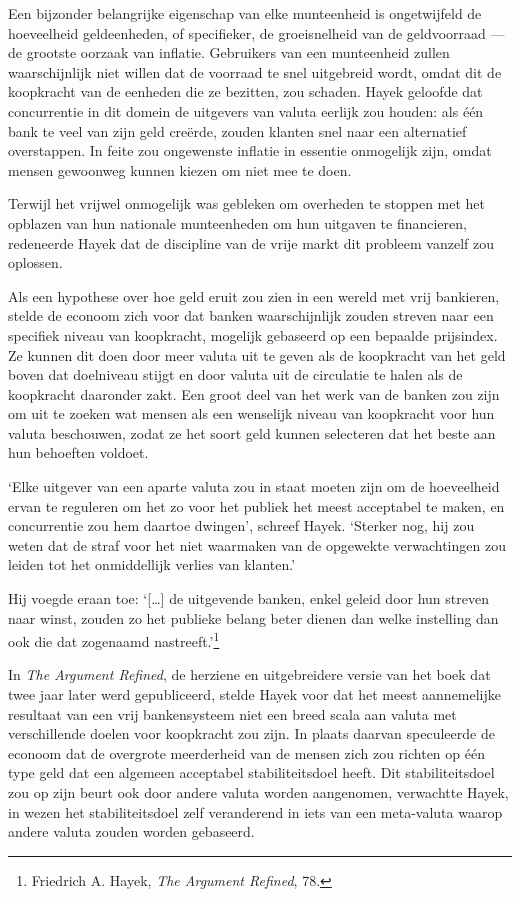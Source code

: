 \documentclass[
  a5paper,
  smalldemyvopaper,11pt,twoside,onecolumn,openright,extrafontsizes,
hidelinks]{memoir}
\begin{document}
Een bijzonder belangrijke eigenschap van elke munteenheid is
ongetwijfeld de hoeveelheid geldeenheden, of specifieker, de
groeisnelheid van de geldvoorraad --- de grootste oorzaak van inflatie.
Gebruikers van een munteenheid zullen waarschijnlijk niet willen dat de
voorraad te snel uitgebreid wordt, omdat dit de koopkracht van de
eenheden die ze bezitten, zou schaden. Hayek geloofde dat concurrentie
in dit domein de uitgevers van valuta eerlijk zou houden: als één bank
te veel van zijn geld creërde, zouden klanten snel naar een alternatief
overstappen. In feite zou ongewenste inflatie in essentie onmogelijk
zijn, omdat mensen gewoonweg kunnen kiezen om niet mee te doen.

Terwijl het vrijwel onmogelijk was gebleken om overheden te stoppen met
het opblazen van hun nationale munteenheden om hun uitgaven te
financieren, redeneerde Hayek dat de discipline van de vrije markt dit
probleem vanzelf zou oplossen.

Als een hypothese over hoe geld eruit zou zien in een wereld met vrij
bankieren, stelde de econoom zich voor dat banken waarschijnlijk zouden
streven naar een specifiek niveau van koopkracht, mogelijk gebaseerd op
een bepaalde prijsindex. Ze kunnen dit doen door meer valuta uit te
geven als de koopkracht van het geld boven dat doelniveau stijgt en door
valuta uit de circulatie te halen als de koopkracht daaronder zakt. Een
groot deel van het werk van de banken zou zijn om uit te zoeken wat
mensen als een wenselijk niveau van koopkracht voor hun valuta
beschouwen, zodat ze het soort geld kunnen selecteren dat het beste aan
hun behoeften voldoet.

`Elke uitgever van een aparte valuta zou in staat moeten zijn om de
hoeveelheid ervan te reguleren om het zo voor het publiek het meest
acceptabel te maken, en concurrentie zou hem daartoe dwingen', schreef
Hayek. `Sterker nog, hij zou weten dat de straf voor het niet waarmaken
van de opgewekte verwachtingen zou leiden tot het onmiddellijk verlies
van klanten.'

Hij voegde eraan toe: `{[}\ldots{]} de uitgevende banken, enkel geleid
door hun streven naar winst, zouden zo het publieke belang beter dienen
dan welke instelling dan ook die dat zogenaamd nastreeft.'\footnote{Friedrich
  A. Hayek, \emph{The Argument Refined}, 78.}

In \emph{The Argument Refined}, de herziene en uitgebreidere versie van
het boek dat twee jaar later werd gepubliceerd, stelde Hayek voor dat
het meest aannemelijke resultaat van een vrij bankensysteem niet een
breed scala aan valuta met verschillende doelen voor koopkracht zou
zijn. In plaats daarvan speculeerde de econoom dat de overgrote
meerderheid van de mensen zich zou richten op één type geld dat een
algemeen acceptabel stabiliteitsdoel heeft. Dit stabiliteitsdoel zou op
zijn beurt ook door andere valuta worden aangenomen, verwachtte Hayek,
in wezen het stabiliteitsdoel zelf veranderend in iets van een
meta-valuta waarop andere valuta zouden worden gebaseerd.
\end{document}
